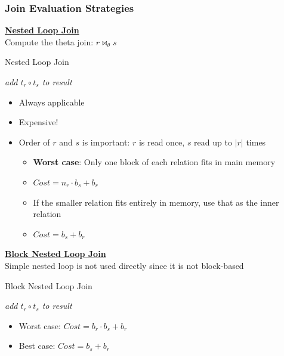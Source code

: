 \subsubsection{Join Evaluation Strategies}

\bigskip
\textbf{\underline{Nested Loop Join}}\\

Compute the theta join: $ r\bowtie_\theta s$
\begin{algorithm}[H]
\begin{algorithmic}[1] %
\caption{Nested Loop Join}
            \State \textit{add $t_r\circ t_s$ to result}
        \EndIf
    \EndFor
\EndFor
\end{algorithmic}
\end{algorithm}
\begin{itemize}[label=\(\rhd\)]
    \item Always applicable
    \item Expensive!
    \item Order of $r$ and $s$ is important: $r$ is read once, $s$ read up to $|r|$ times
    \begin{itemize}[label=\(\rhd\)]
        \item \textbf{Worst case}: Only one block of each relation fits in main memory 
        \item[] $Cost = n_r \cdot b_s + b_r$
        \item If the smaller relation fits entirely in memory, use that as the inner relation
        \item[] $Cost = b_s+b_r$
    \end{itemize}
\end{itemize}

\bigskip
\textbf{\underline{Block Nested Loop Join}}\\

Simple nested loop is not used directly since it is not block-based
\begin{algorithm}[H]
\begin{algorithmic}[1] %
\caption{Block Nested Loop Join}
                    \State \textit{add $t_r\circ t_s$ to result}
                \EndIf
            \EndFor
        \EndFor
    \EndFor
\EndFor
\end{algorithmic}
\end{algorithm}
\begin{itemize}[label=\(\rhd\)]
    \item Worst case: $Cost =b_r \cdot b_s + b_r$
    \item Best case: $Cost = b_s+b_r$
\end{itemize}

